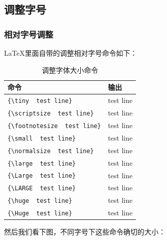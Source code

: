 \documentclass[12pt,oneside]{book}
\begin{document}
\begin{common-format}
\subsection{调整字号}

\subsubsection{相对字号调整}
\LaTeX 里面自带的调整相对字号命令如下：
\begin{table}[H]
\centering
\label{tab:调整字体大小命令}
\begin{tabular}{|l|l|}
\hline
命令 & 输出\\
\hline
\verb+{\tiny  test line}+ & {\tiny  test line}\\
\verb+{\scriptsize  test line}+ & {\scriptsize  test line}\\
\verb+{\footnotesize  test line}+ & {\footnotesize  test line}\\
\verb+{\small  test line}+ & {\small test line}\\
\verb+{\normalsize  test line}+ & {\normalsize  test line}\\
\verb+{\large  test line}+ & {\large  test line}\\
\verb+{\Large  test line}+ & {\Large  test line}\\
\verb+{\LARGE  test line}+ & {\LARGE  test line}\\
\verb+{\huge  test line}+ & {\huge  test line}\\
\verb+{\Huge  test line}+ & {\Huge  test line}\\
\hline
\end{tabular}
\caption{调整字体大小命令}
\end{table}

然后我们看下图，不同字号下这些命令确切的大小：


\end{common-format}
\end{document}
